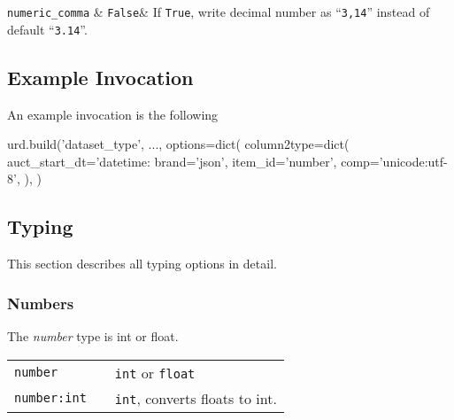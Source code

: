   \RP \texttt{numeric\_comma} & \texttt{False}& If
  \texttt{True}, write decimal number as ``\texttt{3,14}'' instead of
  default ``\texttt{3.14}''.\\[1ex]
\stoptable
  



\subsection{Example Invocation}
An example invocation is the following

\begin{python}
urd.build('dataset_type', ...,
  options=dict(
    column2type=dict(
      auct_start_dt='datetime:%
      brand='json',
      item_id='number',
      comp='unicode:utf-8',
    ),
  )
\end{python}


\clearpage
\subsection{Typing}
This section describes all typing options in detail.

\subsubsection{Numbers}
The \emph{number} type is int or float.
\begin{leftbar}
\begin{tabular}{p{2cm}p{2cm}p{9cm}}
  \texttt{number}     && \texttt{int} or \texttt{float} \\
  \texttt{number:int} && \texttt{int}, converts floats to int.\\
\end{tabular}
\end{leftbar}


